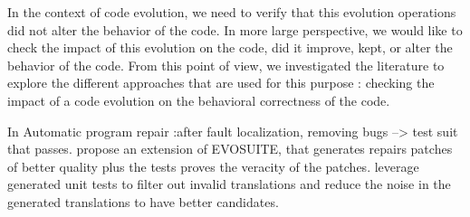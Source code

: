  In the context of code evolution, we need to verify that this evolution operations did not alter the behavior of the code. 
 In more large perspective, we would like to check the impact of this evolution on the code, did it improve, kept, or alter the behavior of the code. From this point of view, we investigated the literature to explore the different approaches that are used for this purpose : checking the impact of a code evolution on the behavioral correctness of the code.
 
In Automatic program repair :after fault localization, removing bugs --> test suit that passes.
\cite{10638555} propose an extension of EVOSUITE, that generates repairs patches of better quality plus the tests proves the veracity of the patches.
\cite{roziere2021leveraging} leverage generated unit tests to filter out invalid translations and reduce the noise in the generated translations to have better candidates.
\cite{LIU2021110817}

